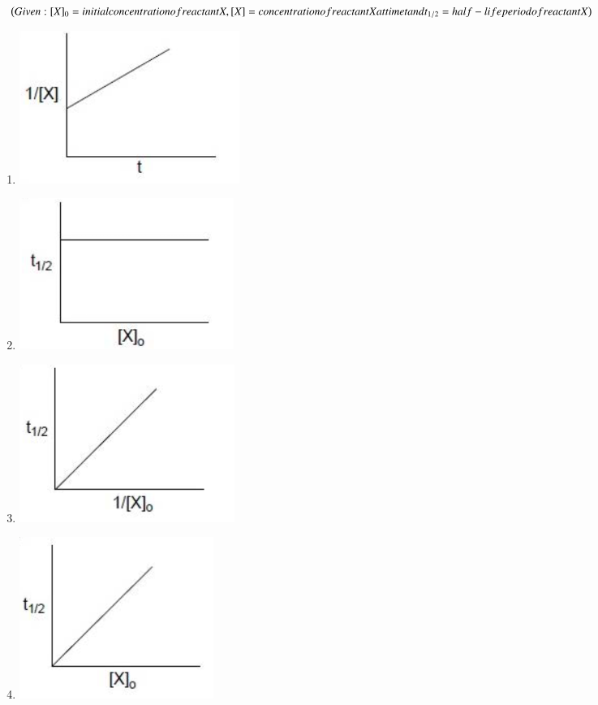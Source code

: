 \documentclass[journal,12pt,onecolumn]{IEEEtran}
\begin{document}
\begin{enumerate}
$\left(Given: [X]_0 =initial concentration of reactant X, [X] = concentration of reactant X at time t and t_{1/2} = half-life period of reactant X\right)$
    \begin{enumerate}
	    \item \includegraphics{15a}
	    \item \includegraphics{15b}
	    \item \includegraphics{15c}
	    \item \includegraphics{15d}
    \end{enumerate}

\end{enumerate}
\end{document}

